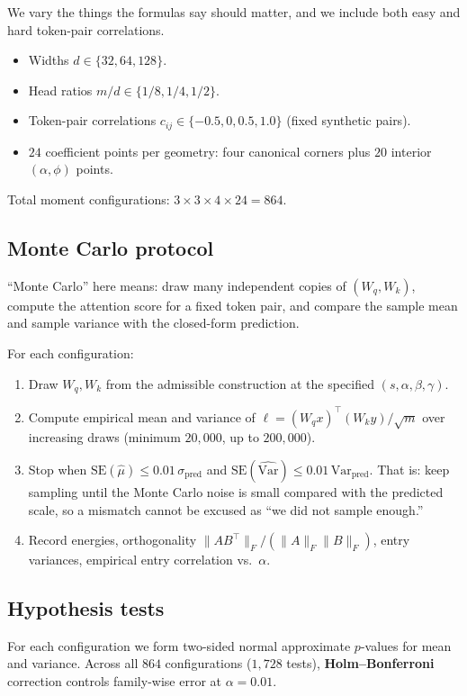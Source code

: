 \documentclass[11pt,a4paper]{report}
\begin{document}
We vary the things the formulas say should matter, and we include both easy and hard token-pair correlations.
\begin{itemize}[leftmargin=*]
  \item Widths $d\in\{32,64,128\}$.
  \item Head ratios $m/d\in\{1/8,1/4,1/2\}$.
  \item Token-pair correlations $c_{ij}\in\{-0.5,0,0.5,1.0\}$ (fixed synthetic pairs).
  \item $24$ coefficient points per geometry: four canonical corners plus $20$ interior $(\alpha,\phi)$ points.
\end{itemize}

Total moment configurations: $3\times 3\times 4\times 24 = 864$.

\subsection{Monte Carlo protocol}

``Monte Carlo'' here means: draw many independent copies of $(W_q,W_k)$, compute the attention score for a fixed token pair, and compare the sample mean and sample variance with the closed-form prediction.

For each configuration:
\begin{enumerate}[leftmargin=*]
  \item Draw $W_q,W_k$ from the admissible construction at the specified $(s,\alpha,\beta,\gamma)$.
  \item Compute empirical mean and variance of $\ell=(W_q x)^\top(W_k y)/\sqrt{m}$ over increasing draws (minimum $20{,}000$, up to $200{,}000$).
  \item Stop when $\mathrm{SE}(\widehat\mu)\le 0.01\,\sigma_{\mathrm{pred}}$ and $\mathrm{SE}(\widehat{\mathrm{Var}})\le 0.01\,\mathrm{Var}_{\mathrm{pred}}$. That is: keep sampling until the Monte Carlo noise is small compared with the predicted scale, so a mismatch cannot be excused as ``we did not sample enough.''
  \item Record energies, orthogonality $\|AB^\top\|_F/(\|A\|_F\|B\|_F)$, entry variances, empirical entry correlation vs.\ $\alpha$.
\end{enumerate}

\subsection{Hypothesis tests}

For each configuration we form two-sided normal approximate $p$-values for mean and variance. Across all $864$ configurations ($1{,}728$ tests), \textbf{Holm--Bonferroni} correction controls family-wise error at $\alpha=0.01$.
\end{document}
